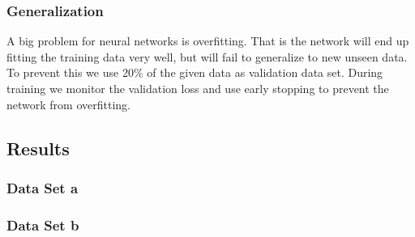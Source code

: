 \documentclass[acmsmall,nonacm]{acmart}
\begin{document}
\subsubsection{Generalization}
A big problem for neural networks is overfitting. That is the network will end up fitting the training data very well, but will fail to generalize to new unseen data. To prevent this we use 20\% of the given data as validation data set. During training we monitor the validation loss and use early stopping to prevent the network from overfitting. 


\subsection{Results}

\subsubsection{Data Set a}

\subsubsection{Data Set b}
\end{document}
